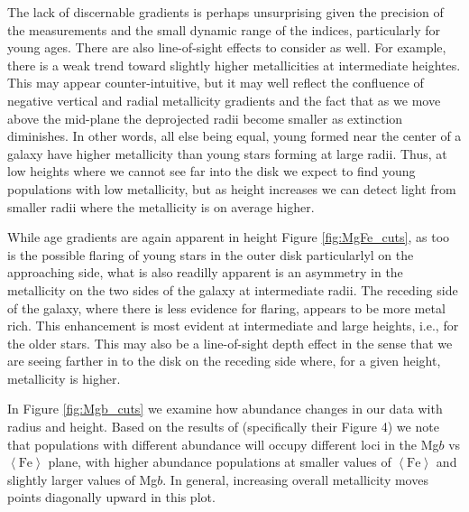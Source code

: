 The lack of discernable gradients is perhaps unsurprising given the
precision of the measurements and the small dynamic range of the
indices, particularly for young ages. There are also line-of-sight
effects to consider as well. For example, there is a weak trend toward
slightly higher metallicities at intermediate heightes. This may
appear counter-intuitive, but it may well reflect the confluence of
negative vertical and radial metallicity gradients and the fact that
as we move above the mid-plane the deprojected radii become smaller as
extinction diminishes.  In other words, all else being equal, young
formed near the center of a galaxy have higher metallicity than
young stars forming at large radii. Thus, at low heights where we
cannot see far into the disk we expect to find young populations with
low metallicity, but as height increases we can detect light from
smaller radii where the metallicity is on average higher.

While age gradients are again apparent in height Figure
\ref{fig:MgFe_cuts}, as too is the possible flaring of young stars
in the outer disk particularlyl on the approaching side, what is
also readilly apparent is an asymmetry in the metallicity on the two
sides of the galaxy at intermediate radii. The receding side of the
galaxy, where there is less evidence for flaring, appears to be more
metal rich. This enhancement is most evident at intermediate and large
heights, i.e., for the older stars. This may also be a line-of-sight
depth effect in the sense that we are seeing farther in to the disk on
the receding side where, for a given height, metallicity is higher.


In Figure \ref{fig:Mgb_cuts} we examine how abundance changes in our
data with radius and height. Based on the results of \citet{Thomas03}
(specifically their Figure 4) we note that populations with different
abundance will occupy different loci in the Mg$b$ vs
$\left<\mathrm{Fe}\right>$ plane, with higher abundance populations at
smaller values of $\left<\mathrm{Fe}\right>$ and slightly larger
values of Mg$b$. In general, increasing overall metallicity moves
points diagonally upward in this plot.

